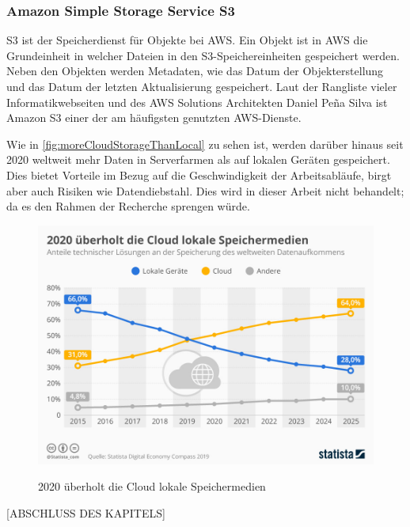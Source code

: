 \subsubsection{Amazon Simple Storage Service S3}
S3 ist der Speicherdienst für Objekte bei AWS. Ein Objekt ist in AWS die Grundeinheit in welcher Dateien in den S3-Speichereinheiten gespeichert werden.
\\
Neben den Objekten werden Metadaten, wie das Datum der Objekterstellung und das Datum der letzten Aktualisierung gespeichert. Laut der Rangliste vieler Informatikwebseiten und des
AWS Solutions Architekten Daniel Peña Silva{\cite{STA1}} ist Amazon S3 einer der am häufigsten genutzten AWS-Dienste.

Wie in \autoref{fig:moreCloudStorageThanLocal} zu sehen ist, werden darüber hinaus seit 2020 weltweit mehr Daten in Serverfarmen als auf lokalen Geräten gespeichert. Dies bietet Vorteile im Bezug auf die Geschwindigkeit der Arbeitsabläufe, birgt aber auch Risiken wie Datendiebstahl. Dies wird in dieser Arbeit nicht behandelt; da es den Rahmen der Recherche sprengen würde.
\begin{figure}[h!]
      \centering
      \includegraphics[scale=0.4]{sources/moreCloudStorageThanLocal}
      \caption[2020 überholt die Cloud lokale Speichermedien]{}\label{fig:moreCloudStorageThanLocal}
      2020 überholt die Cloud lokale Speichermedien
            {\cite{STA1}}
\end{figure}

[ABSCHLUSS DES KAPITELS]
\newpage


